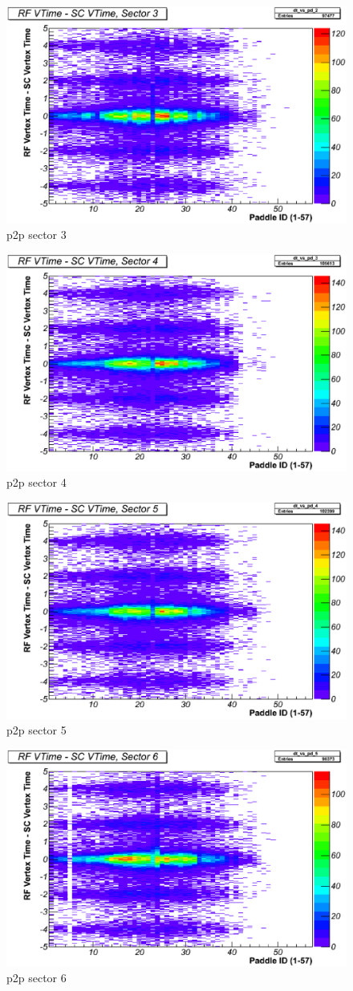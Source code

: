 \begin{figure}\begin{center}
	\includegraphics[width=.40\linewidth]{figures/calib/tof/Tof_56855_final_s3p2p.eps}
	\caption{p2p sector 3}
	\label{plt:tofsec3}
\end{center}\end{figure}

\begin{figure}\begin{center}
	\includegraphics[width=.40\linewidth]{figures/calib/tof/Tof_56855_final_s4p2p.eps}
	\caption{p2p sector 4}
	\label{plt:tofsec4}
\end{center}\end{figure}

\begin{figure}\begin{center}
	\includegraphics[width=.40\linewidth]{figures/calib/tof/Tof_56855_final_s5p2p.eps}
	\caption{p2p sector 5}
	\label{plt:tofsec5}
\end{center}\end{figure}

\begin{figure}\begin{center}
	\includegraphics[width=.40\linewidth]{figures/calib/tof/Tof_56855_final_s6p2p.eps}
	\caption{p2p sector 6}
	\label{plt:tofsec6}
\end{center}\end{figure}

